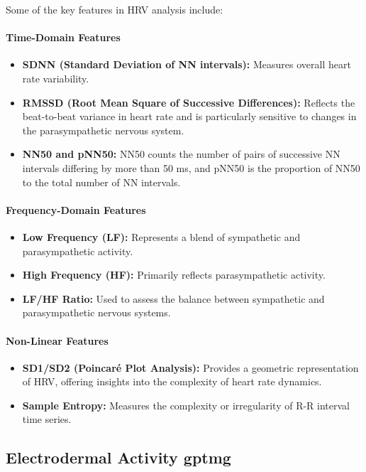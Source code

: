 Some of the key features in HRV analysis include:
\paragraph*{Time-Domain Features}
\begin{itemize}
    \item \textbf{SDNN (Standard Deviation of NN intervals):} Measures overall heart rate variability.
    \item \textbf{RMSSD (Root Mean Square of Successive Differences):} Reflects the beat-to-beat variance in heart rate and is particularly sensitive to changes in the parasympathetic nervous system.
    \item \textbf{NN50 and pNN50:} NN50 counts the number of pairs of successive NN intervals differing by more than 50 ms, and pNN50 is the proportion of NN50 to the total number of NN intervals.
\end{itemize}

\paragraph*{Frequency-Domain Features}
\begin{itemize}
    \item \textbf{Low Frequency (LF):} Represents a blend of sympathetic and parasympathetic activity.
    \item \textbf{High Frequency (HF):} Primarily reflects parasympathetic activity.
    \item \textbf{LF/HF Ratio:} Used to assess the balance between sympathetic and parasympathetic nervous systems.
\end{itemize}

\paragraph*{Non-Linear Features}
\begin{itemize}
    \item \textbf{SD1/SD2 (Poincaré Plot Analysis):} Provides a geometric representation of HRV, offering insights into the complexity of heart rate dynamics.
    \item \textbf{Sample Entropy:} Measures the complexity or irregularity of R-R interval time series.
\end{itemize}


\subsection{Electrodermal Activity \gls{gptmg}}

